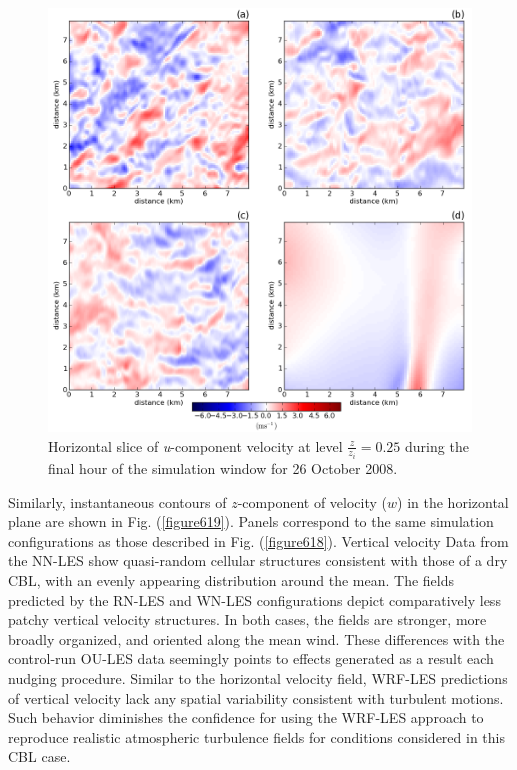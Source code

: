 \begin{figure}[H]
\begin{center}
\includegraphics[width=\textwidth]{figures/chapter6/u_slice_20081026}
\end{center}
\caption{Horizontal slice of \textit{u}-component velocity at level $\frac{z}{z_i} = 0.25$ during the final hour of the simulation window for 26 October 2008.}
\label{figure618}
\end{figure}


Similarly, instantaneous contours of $z$-component of velocity ($w$) in the horizontal plane are shown in Fig. (\autoref{figure619}). Panels correspond to the same simulation configurations as those described in Fig. (\autoref{figure618}). Vertical velocity Data from the NN-LES show quasi-random cellular structures consistent with those of a dry CBL, with an evenly appearing distribution around the mean. The fields predicted by the RN-LES and WN-LES configurations depict comparatively less patchy vertical velocity structures. In both cases, the fields are stronger, more broadly organized, and oriented along the mean wind. These differences with the control-run OU-LES data seemingly points to effects generated as a result each nudging procedure. Similar to the horizontal velocity field, WRF-LES predictions of vertical velocity lack any spatial variability consistent with turbulent motions. Such behavior diminishes the confidence for using the WRF-LES approach to reproduce realistic atmospheric turbulence fields for conditions considered in this CBL case.


